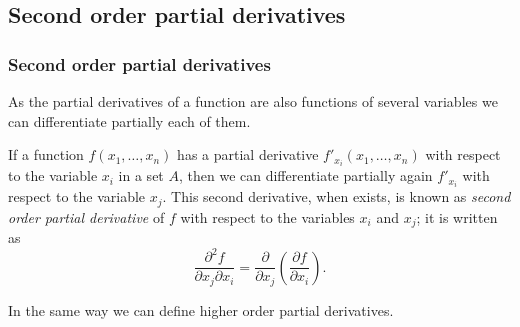 % 
% 
% 
% 
% 
\subsection{Second order partial derivatives}
\begin{frame}
\frametitle{Second order partial derivatives}
As the partial derivatives of a function are also functions of several variables we can differentiate partially each of them. 

If a function $f(x_1,\ldots,x_n)$ has a partial derivative $f'_{x_i}(x_1,\ldots,x_n)$ with respect to the variable $x_i$ in a set $A$, then we can differentiate partially again $f'_{x_i}$ with respect to the variable $x_j$. 
This second derivative, when exists, is known as \emph{second order partial derivative} of $f$ with respect to the variables $x_i$ and $x_j$; it is written as 
\[
\frac{\partial ^2 f}{\partial x_j \partial x_i}= \frac{\partial}{\partial x_j}\left(\frac{\partial f}{\partial x_i}\right).
\]

In the same way we can define higher order partial derivatives.
\end{frame}


